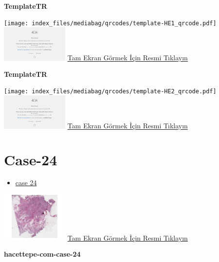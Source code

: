 \documentclass[
  letterpaper,
  DIV=11,
  numbers=noendperiod]{scrreprt}
\providecommand{\tightlist}{%
  \setlength{\itemsep}{0pt}\setlength{\parskip}{0pt}}\usepackage{longtable,booktabs,array}
\begin{document}
\textbf{TemplateTR}

\texttt{[image: index\_files/mediabag/qrcodes/template-HE1\_qrcode.pdf]}
\href{https://images.patolojiatlasi.com/template/HE1.html}{\includegraphics[width=0.25\textwidth,height=\textheight]{./screenshots/thumbnail_template-HE1.png}}
\href{https://images.patolojiatlasi.com/template/HE1.html}{Tam Ekran
Görmek İçin Resmi Tıklayın}

\textbf{TemplateTR}

\texttt{[image: index\_files/mediabag/qrcodes/template-HE2\_qrcode.pdf]}
\href{https://images.patolojiatlasi.com/template/HE2.html}{\includegraphics[width=0.25\textwidth,height=\textheight]{./screenshots/thumbnail_template-HE2.png}}
\href{https://images.patolojiatlasi.com/template/HE2.html}{Tam Ekran
Görmek İçin Resmi Tıklayın}

\hypertarget{sec-hacettepe-case-of-the-month-case-24}{%
\section{Case-24}\label{sec-hacettepe-case-of-the-month-case-24}}

\begin{itemize}
\tightlist
\item
  \href{https://www.youtube.com/watch?v=-S0_Hr6sNZ8&ab_channel=KemalKosemehmetoglu}{case
  24}
\end{itemize}

\href{https://images.patolojiatlasi.com/hacettepe-com-case-24/HE.html}{\includegraphics[width=0.25\textwidth,height=\textheight]{./screenshots/thumbnail_hacettepe-com-case-24.png}}
\href{https://images.patolojiatlasi.com/hacettepe-com-case-24/HE.html}{Tam
Ekran Görmek İçin Resmi Tıklayın}

\textbf{hacettepe-com-case-24}
\end{document}

